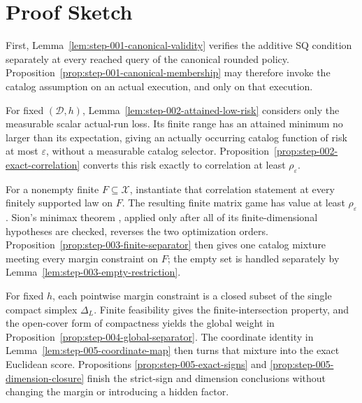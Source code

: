 \section{Proof Sketch}
\label{sec:proof-sketch}

First, Lemma~\ref{lem:step-001-canonical-validity} verifies the additive SQ
condition separately at every reached query of the canonical rounded policy.
Proposition~\ref{prop:step-001-canonical-membership} may therefore invoke the
catalog assumption on an actual execution, and only on that execution.

For fixed \((\mathcal D,h)\),
Lemma~\ref{lem:step-002-attained-low-risk} considers only the measurable
scalar actual-run loss.  Its finite range has an attained minimum no larger
than its expectation, giving an actually occurring catalog function of risk
at most \(\varepsilon\), without a measurable catalog selector.
Proposition~\ref{prop:step-002-exact-correlation} converts this risk exactly
to correlation at least \(\rho_{\varepsilon}\).

For a nonempty finite \(F\subseteq\mathcal X\), instantiate that correlation
statement at every finitely supported law on \(F\).  The resulting finite
matrix game has value at least \(\rho_{\varepsilon}\).  Sion's minimax
theorem \citep[Theorem~3.4]{Sion1958}, applied only after all of its
finite-dimensional hypotheses are checked, reverses the two optimization
orders.  Proposition~\ref{prop:step-003-finite-separator} then gives one
catalog mixture meeting every margin constraint on \(F\); the empty set is
handled separately by Lemma~\ref{lem:step-003-empty-restriction}.

For fixed \(h\), each pointwise margin constraint is a closed subset of the
single compact simplex \(\Delta_L\).  Finite feasibility gives the
finite-intersection property, and the open-cover form of compactness yields
the global weight in Proposition~\ref{prop:step-004-global-separator}.  The
coordinate identity in Lemma~\ref{lem:step-005-coordinate-map} then turns
that mixture into the exact Euclidean score.  Propositions
\ref{prop:step-005-exact-signs} and
\ref{prop:step-005-dimension-closure} finish the strict-sign and dimension
conclusions without changing the margin or introducing a hidden factor.
